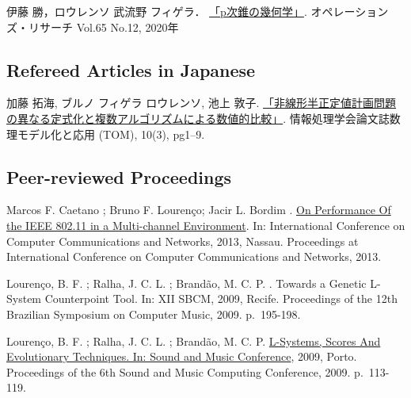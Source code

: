 伊藤 勝，ロウレンソ 武流野 フィゲラ．
\href{http://www.orsj.or.jp/archive2/or65-12/or65_12_668.pdf}{「p次錐の幾何学」}.
オペレーションズ・リサーチ Vol.65 No.12, 2020年

\hypertarget{refereed-articles-in-japanese}{%
\subsection{Refereed Articles in
Japanese}\label{refereed-articles-in-japanese}}

加藤 拓海, ブルノ フィゲラ ロウレンソ, 池上 敦子.
\href{http://id.nii.ac.jp/1001/00184828/}{「非線形半正定値計画問題の異なる定式化と複数アルゴリズムによる数値的比較」}.
情報処理学会論文誌数理モデル化と応用 (TOM), 10(3), pg1--9.

\hypertarget{peer-reviewed-proceedings}{%
\subsection{Peer-reviewed Proceedings}\label{peer-reviewed-proceedings}}

Marcos F. Caetano ; Bruno F. Lourenço; Jacir L. Bordim .
\href{http://ieeexplore.ieee.org/stamp/stamp.jsp?tp=\&arnumber=6614163\&isnumber=6614072}{On
Performance Of the IEEE 802.11 in a Multi-channel Environment}. In:
International Conference on Computer Communications and Networks, 2013,
Nassau. Proceedings at International Conference on Computer
Communications and Networks, 2013.

Lourenço, B. F. ; Ralha, J. C. L. ; Brandão, M. C. P. . Towards a
Genetic L-System Counterpoint Tool. In: XII SBCM, 2009, Recife.
Proceedings of the 12th Brazilian Symposium on Computer Music, 2009.
p.~195-198.

Lourenço, B. F. ; Ralha, J. C. L. ; Brandão, M. C. P.
\href{http://smc2009.smcnetwork.org/programme/pdfs/229.pdf}{L-Systems,
Scores And Evolutionary Techniques. In: Sound and Music Conference},
2009, Porto. Proceedings of the 6th Sound and Music Computing
Conference, 2009. p.~113-119.
